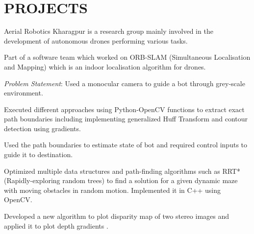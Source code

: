 \documentclass[]{deedy-resume-openfont}
\begin{document}
\begin{minipage}[t]{0.66\textwidth} 



\section{PROJECTS}

\vspace{\topsep} %
\begin{tightemize}
\item Aerial Robotics Kharagpur is a research group mainly involved in the development of autonomous drones performing various tasks.   
\item Part of a software team which worked on ORB-SLAM (Simultaneous Localisation and Mapping) which is an indoor localisation algorithm for drones.
\end{tightemize}
\sectionsep

\begin{tightemize}
\item {\emph{Problem Statement}:} Used a monocular camera to guide a bot through grey-scale environment.   
\item Executed different approaches using Python-OpenCV functions to extract exact path boundaries including implementing generalized Huff Transform and contour detection using gradients. 
\item Used the path boundaries to estimate state of bot and required control inputs to guide it to destination.
\end{tightemize}
\sectionsep

\begin{tightemize}
\item Optimized multiple data structures and path-finding algorithms such as RRT*(Rapidly-exploring random trees) to find a solution for a given dynamic maze with moving obstacles in random motion. Implemented it in C++ using OpenCV.
\item Developed a new algorithm to plot disparity map of two stereo images and applied it to plot depth gradients .

\end{tightemize}
\sectionsep


\end{minipage}
\end{document}
